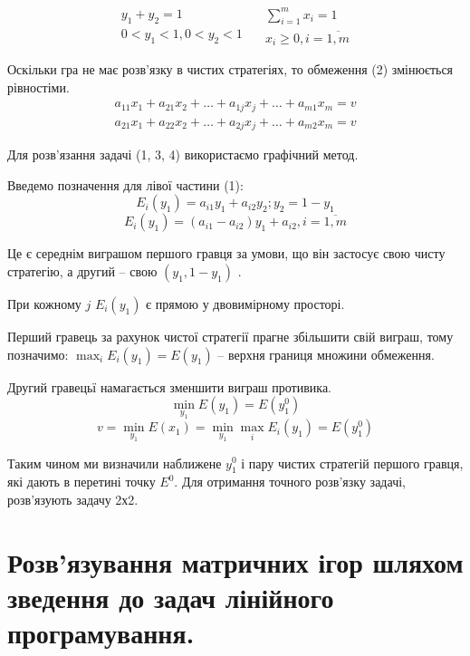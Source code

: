 \documentclass[12pt,a4paper]{report}
\begin{document}
\begin{equation}
\begin{array}{c}
y_1+y_2=1\\
0<y_1<1, 0<y_2<1
\end{array}
\quad
\begin{array}{c}
\sum_{i=1}^m x_i=1\\
x_i \ge 0, i=\overline{1,m}
\end{array}
\end{equation}

Оскільки гра не має розв'язку в чистих стратегіях, то обмеження (2) змінюється рівностіми.
\begin{equation}
\begin{array}{l}
a_{11}x_1+a_{21}x_2+\dots+a_{1j}x_j+\dots+a_{m1}x_m = v\\
a_{21}x_1+a_{22}x_2+\dots+a_{2j}x_j+\dots+a_{m2}x_m = v
\end{array}
\end{equation}

Для розв'язання задачі (1, 3, 4) використаємо графічний метод.

Введемо позначення для лівої частини (1):
\[E_i(y_1) = a_{i1}y_1+a_{i2}y_2; y_2=1-y_1\]
\begin{equation}
E_i(y_1)=(a_{i1}-a_{i2})y_1+a_{i2}, i=\overline{1,m}
\end{equation}

Це є середнім виграшом першого гравця за умови, що він застосує свою чисту стратегію, а другий -- свою $(y_1,1-y_1)$ .

При кожному $j$ $E_i(y_1)$ є прямою у двовимірному просторі.

Перший гравець за рахунок чистої стратегії прагне збільшити свій виграш, тому позначимо:
$\displaystyle \max_iE_i(y_1)=E(y_1)$ -- верхня границя множини обмеження.

Другий гравецьї намагається зменшити виграш противика.
\[\min_{y_1} E(y_1) = E(y_1^0)\]
\[v=\min_{y_1} E(x_1)=\min_{y_1} \max_iE_i(y_1)=E(y_1^0)\]

Таким чином ми визначили наближене $y_1^0$ і пару чистих стратегій першого гравця, які дають в перетині точку $E^0$. Для отримання точного розв'язку задачі, розв'язують задачу 2х2. 

\clearpage

\chapter{Розв'язування матричних ігор шляхом зведення до задач лінійного програмування.}
\end{document}

